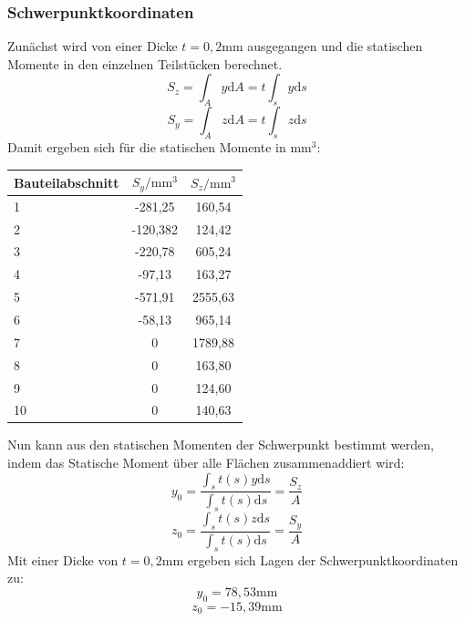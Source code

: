 \subsubsection{Schwerpunktkoordinaten}\label{SP-Koord}
Zunächst wird von einer Dicke $t=0,2\mathrm{mm}$ ausgegangen und die statischen Momente in den einzelnen Teilstücken berechnet.
\begin{equation}\label{SM1}
	S_{z}=\int_{A}^{}y \mathrm{d}A =t\int_{s}^{}y \mathrm{d}s
\end{equation}
\begin{equation}\label{SM2}
	S_{y}=\int_{A}^{}z \mathrm{d}A =t\int_{s}^{}z \mathrm{d}s 
\end{equation}
Damit ergeben sich für die statischen Momente in $\mathrm{mm}^3$:

\begin{center}
\begin{tabular}[h]{l|c|c}
	
Bauteilabschnitt&$S_{y}/\mathrm{mm}^3$&$S_{z}/\mathrm{mm}^3$\\
\hline
1& -281,25&160,54\\
2&-120,382&124,42\\
3&-220,78&605,24\\
4&-97,13&163,27\\
5&-571,91&2555,63\\
6&-58,13&965,14\\
7&0&1789,88\\
8&0&163,80\\
9&0&124,60\\
10&0&140,63\\
\end{tabular}
\end{center}

\noindent Nun kann aus den statischen Momenten der Schwerpunkt bestimmt werden, indem das Statische Moment über alle Flächen zusammenaddiert wird:
\begin{equation}
	y_{0}=\frac{\int_{s}{}t(s)y\mathrm{d}s}{\int_{s}{}t(s)\mathrm{d}s}=\frac{S_{z}}{A}
\end{equation}
\begin{equation}
	z_{0}=\frac{\int_{s}{}t(s)z\mathrm{d}s}{\int_{s}{}t(s)\mathrm{d}s}=\frac{S_{y}}{A}
\end{equation}
Mit einer Dicke von $t=0,2\mathrm{mm}$ ergeben sich Lagen der Schwerpunktkoordinaten zu:
$$
	y_{0}=78,53\mathrm{mm}
$$
$$
	z_{0}=-15,39\mathrm{mm}
$$

